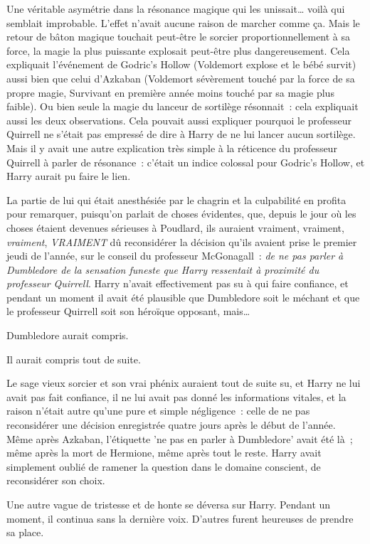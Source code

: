 Une véritable asymétrie dans la résonance magique qui les unissait… voilà qui semblait improbable. L'effet n'avait aucune raison de marcher comme ça. Mais le retour de bâton magique touchait peut-être le sorcier proportionnellement à sa force, la magie la plus puissante explosait peut-être plus dangereusement. Cela expliquait l'événement de Godric's Hollow (Voldemort explose et le bébé survit) aussi bien que celui d'Azkaban (Voldemort sévèrement touché par la force de sa propre magie, Survivant en première année moins touché par sa magie plus faible). Ou bien seule la magie du lanceur de sortilège résonnait~: cela expliquait aussi les deux observations. Cela pouvait aussi expliquer pourquoi le professeur Quirrell ne s'était pas empressé de dire à Harry de ne lui lancer aucun sortilège. Mais il y avait une autre explication très simple à la réticence du professeur Quirrell à parler de résonance~: c'était un indice colossal pour Godric's Hollow, et Harry aurait pu faire le lien.

La partie de lui qui était anesthésiée par le chagrin et la culpabilité en profita pour remarquer, puisqu'on parlait de choses évidentes, que, depuis le jour où les choses étaient devenues sérieuses à Poudlard, ils auraient vraiment, vraiment, \emph{vraiment}, \emph{VRAIMENT} dû reconsidérer la décision qu'ils avaient prise le premier jeudi de l'année, sur le conseil du professeur McGonagall~: \emph{de ne pas parler à Dumbledore de la sensation funeste que Harry ressentait à proximité du professeur Quirrell}. Harry n'avait effectivement pas su à qui faire confiance, et pendant un moment il avait été plausible que Dumbledore soit le méchant et que le professeur Quirrell soit son héroïque opposant, mais…

Dumbledore aurait compris.

Il aurait compris tout de suite.

Le sage vieux sorcier et son vrai phénix auraient tout de suite su, et Harry ne lui avait pas fait confiance, il ne lui avait pas donné les informations vitales, et la raison n'était autre qu'une pure et simple négligence~: celle de ne pas reconsidérer une décision enregistrée quatre jours après le début de l'année. Même après Azkaban, l'étiquette 'ne pas en parler à Dumbledore' avait été là~; même après la mort de Hermione, même après tout le reste. Harry avait simplement oublié de ramener la question dans le domaine conscient, de reconsidérer son choix.

Une autre vague de tristesse et de honte se déversa sur Harry. Pendant un moment, il continua sans la dernière voix. D'autres furent heureuses de prendre sa place.

